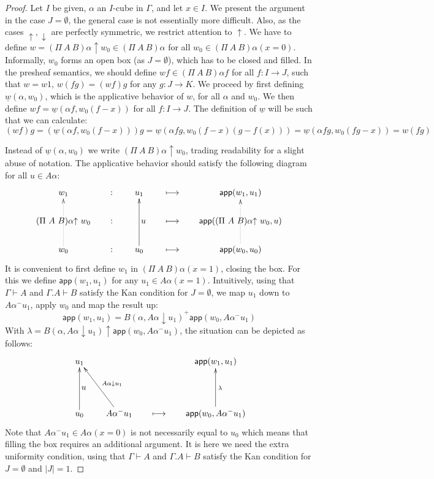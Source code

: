 \documentclass[10pt,a4paper]{article}
\newcommand{\app}{\mathsf{app}}
\newcommand{\es}{\emptyset}
\newcommand{\lto}{\longmapsto}
\newcommand{\rup}[1]{#1{\uparrow}}
\newcommand{\rdo}[1]{#1{\downarrow}}
\newcommand{\del}[1]{}
\newcommand{\ul}[1]{\underline{#1}}
\begin{document}
\begin{proof}
  Let $I$ be given, $\alpha$ an $I$-cube in $\Gamma$, and let $x\in
  I$.  We present the argument in the case $J=\es$, the general case
  is not essentially more difficult.  Also, as the cases
  $\rup{},\rdo{}$ are perfectly symmetric, we restrict attention to
  $\rup{}$.  We have to define $w=\rup{(\Pi~A~B)\alpha} w_0 \in
  (\Pi~A~B)\alpha$ for all $w_0 \in (\Pi~A~B)\alpha(x=0)$.
  Informally, $w_0$ forms an open box (as $J=\es$), which has to be
  closed and filled.  In the presheaf semantics, we should define
  $wf\in(\Pi~A~B)\alpha f$ for all $f:I\to J$, such that $w=w1$,
  $w(fg) = (wf)g$ for any $g:J\to K$.  We proceed by first defining
  $\ul{w}(\alpha,w_0)$, which is the applicative behavior of $w$, for
  all $\alpha$ and $w_0$.  We then define $wf=\ul{w}(\alpha
  f,w_0(f-x))$ for all $f:I\to J$.  The definition of $\ul{w}$ will be
  such that we can calculate:
  \[
  (wf)g = (\ul{w}(\alpha f,w_0(f-x)))g = \ul{w}(\alpha
  fg,w_0(f-x)(g-f(x))) = \ul{w}(\alpha fg,w_0(fg-x)) = w(fg)
  \]

  Instead of $\ul{w}(\alpha,w_0)$ we write $\rup{(\Pi~A~B)\alpha}
  w_0$, trading readability for a slight abuse of notation.  The
  applicative behavior should satisfy the following diagram for all
  $u\in A\alpha$:
  \[
  \xymatrix@R=.6cm@C=.6cm{
    w_1                                         &:&   u_1\del{\in A\alpha(x=1)}             &\lto &   \app(w_1,u_1)\del{\in B(\alpha(x=1),u_1)}  \\
    \rup{(\Pi~A~B)\alpha}~w_0 &:&    ~~~u\del{\in A\alpha}                  &\lto &    \app(\rup{(\Pi~A~B)\alpha}~w_0,u)\del{\in B(\alpha,u)}   \\
    w_0\ar@{.>}[uu]                   &:&    u_0\del{\in A\alpha(x=0)}\ar[uu] &\lto &    \app(w_0,u_0)\del{\in B(\alpha(x=0),u_0)}\ar@{.>}[uu]   \\
  }
  \]
  It is convenient to first define $w_1$ in $(\Pi~A~B)\alpha(x=1)$,
  closing the box.  For this we define $\app(w_1,u_1)$ for any $u_1\in
  A\alpha(x=1)$.  Intuitively, using that $\Gamma\vdash A$ and
  $\Gamma.A\vdash B$ satisfy the Kan condition for $J=\es$, we map
  $u_1$ down to $A\alpha^- u_1$, apply $w_0$ and map the result up:
  $$
  \app(w_1,u_1) = B(\alpha,\rdo{A\alpha}u_1)^+\app(w_0,A\alpha^- u_1)
  $$
  With $\lambda=\rup{B(\alpha,\rdo{A\alpha}u_1)} \app(w_0,A\alpha^-
  u_1)$, the situation can be depicted as follows:
  \[
  \xymatrix@R=.6cm@C=.6cm{
    u_1            && &   \app(w_1,u_1)  \\
    ~~~u               && &    \\
    u_0\ar[uu]      &A\alpha^- u_1\ar[uul]_{\rdo{A\alpha}u_1}&\lto &    \app(w_0,A\alpha^- u_1)\ar[uu]_\lambda  \\
  }
  \]
  Note that $A\alpha^- u_1 \in A\alpha(x=0)$ is not necessarily equal
  to $u_0$ which means that filling the box requires an additional
  argument.  It is here we need the extra uniformity condition, using
  that $\Gamma\vdash A$ and $\Gamma.A\vdash B$ satisfy the Kan
  condition for $J=\es$ and $|J|=1$.


\end{proof}
\end{document}
